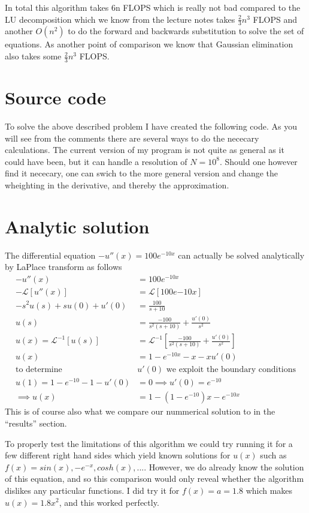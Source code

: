 \documentclass[a4paper,english, 10pt, twoside]{article}
\begin{document}
In total this algorithm takes 6n FLOPS which is really not bad compared to the LU decomposition which we know from the 
lecture notes takes $\frac{2}{3}n^3$ FLOPS and another $O(n^2)$ to do the forward and backwards substitution to solve the set of
equations. As another point of comparison we know that Gaussian elimination also takes some $\frac{2}{3}n^3$ FLOPS.

\section*{Source code}
To solve the above described problem I have created the following code. As you will see from the comments there are several 
ways to do the nececary calculations. The current version of my program is not quite as general as it could have been, but it
can handle a resolution of $N = 10^8$. Should one however find it nececary, one can swich to the more general version and change
the wheighting in the derivative, and thereby the approximation.


\section*{Analytic solution}
The differential equation $-u''(x) = 100e^{-10x}$ can actually be solved analytically by LaPlace transform as follows
\begin{align*}
 -u''(x) &= 100e^{-10x}\\
 -\mathcal{L}[u''(x)] &= \mathcal{L}[100e{-10x}]\\
 -s^2u(s) +su(0) + u'(0) &= \frac{100}{s+10}\\
 u(s) &= \frac{-100}{s^2(s+10)} + \frac{u'(0)}{s^2}\\
 u(x) = \mathcal{L}^{-1}[u(s)] &= \mathcal{L}^{-1}\left[\frac{-100}{s^2(s+10)} + \frac{u'(0)}{s^2}\right]\\
 u(x) &= 1-e^{-10x} -x -xu'(0)\\
 \text{to determine }&u'(0)\text{ we exploit the boundary conditions}\\
 u(1) = 1-e^{-10} -1 -u'(0) &= 0 \implies u'(0) = e^{-10}\\
 \implies u(x) &=  1-(1-e^{-10})x-e^{-10x}
\end{align*}
This is of course also what we compare our nummerical solution to in the ``results'' section.

To properly test the limitations of this algorithm we could try running it for a few different right hand sides which yield 
known solutions for $u(x)$ such as $f(x) = sin(x),-e^{-x}, cosh(x),...$. However, we do already know the solution of this equation, 
and so this comparison would only reveal whether the algorithm dislikes any particular functions. I did try it for $f(x) = a = 1.8$
which makes $u(x) = 1.8x^2$, and this worked perfectly.\\
\end{document}
